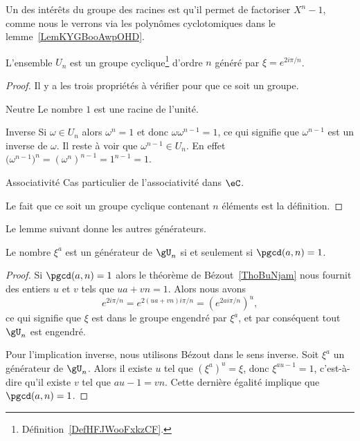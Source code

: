 Un des intérêts du groupe des racines est qu'il permet de factoriser \( X^n-1\), comme nous le verrons via les polynômes cyclotomiques dans le lemme~\ref{LemKYGBooAwpOHD}.

\begin{lemma}       \label{LemWHQGooXyeJiw}
    L'ensemble \( U_n\) est un groupe cyclique\footnote{Définition~\ref{DefHFJWooFxkzCF}.} d'ordre \( n\) généré par \( \xi= e^{2i\pi/n}\).
\end{lemma}

\begin{proof}
    Il y a les trois propriétés à vérifier pour que ce soit un groupe.
    \begin{subproof}
        \item[Neutre]
            Le nombre \( 1\) est une racine de l'unité.
    \item[Inverse]
        Si \( \omega\in U_n\) alors \( \omega^n=1\) et donc \( \omega\omega^{n-1}=1\), ce qui signifie que \( \omega^{n-1}\) est un inverse de \( \omega\). Il reste à voir que \( \omega^{n-1}\in U_n\). En effet \(  \big( \omega^{n-1} \big)^n=(\omega^n)^{n-1}=1^{n-1}=1  \).
    \item[Associativité]
        Cas particulier de l'associativité dans \( \eC\).
    \end{subproof}
    Le fait que ce soit un groupe cyclique contenant \( n\) éléments est la définition.
\end{proof}


Le lemme suivant donne les autres générateurs.
\begin{lemma}   \label{LemcFTNMa}
    Le nombre \( \xi^a\) est un générateur de \( \gU_n\) si et seulement si \( \pgcd(a,n)=1\).
\end{lemma}

\begin{proof}
    Si \( \pgcd(a,n)=1\) alors le théorème de Bézout~\ref{ThoBuNjam} nous fournit des entiers \( u\) et \( v\) tels que \( ua+vn=1\). Alors nous avons
    \begin{equation}
        e^{2i\pi /n}= e^{2(ua+vn)i\pi/n}=( e^{2ai\pi/n})^u,
    \end{equation}
    ce qui signifie que \( \xi\) est dans le groupe engendré par \( \xi^a\), et par conséquent tout \( \gU_n\) est engendré.

    Pour l'implication inverse, nous utilisons Bézout dans le sens inverse. Soit \( \xi^a\) un générateur de \( \gU_n\). Alors il existe \( u\) tel que \( (\xi^a)^u=\xi\), donc \( \xi^{au-1}=1\), c'est-à-dire qu'il existe \( v\) tel que \( au-1=vn\). Cette dernière égalité implique que \( \pgcd(a,n)=1\).
\end{proof}

